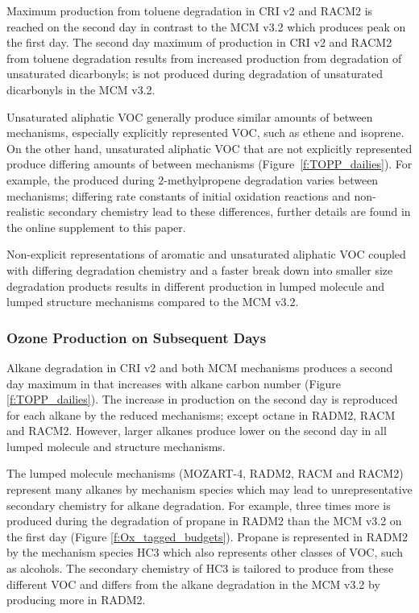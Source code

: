 Maximum  production from toluene degradation in CRI v2 and RACM2 is reached on the second day in contrast to the MCM v3.2 which produces peak  on the first day.
The second day maximum of  production in CRI v2 and RACM2 from toluene degradation results from increased  production from degradation of unsaturated dicarbonyls;  is not produced during degradation of unsaturated dicarbonyls in the MCM v3.2.

Unsaturated aliphatic VOC generally produce similar amounts of  between mechanisms, especially explicitly represented VOC, such as ethene and isoprene.
On the other hand, unsaturated aliphatic VOC that are not explicitly represented produce differing amounts of  between mechanisms \mbox{(Figure \ref{f:TOPP_dailies}).}
For example, the  produced during $2$-methylpropene degradation varies between mechanisms; differing rate constants of initial oxidation reactions and non-realistic secondary chemistry lead to these differences, further details are found in the online supplement to this paper.

Non-explicit representations of aromatic and unsaturated aliphatic VOC coupled with differing degradation chemistry and a faster break down into smaller size degradation products results in different  production in lumped molecule and lumped structure mechanisms compared to the MCM v3.2.
%
\subsubsection{Ozone Production on Subsequent Days} \label{sss:profiles} %
%
Alkane degradation in CRI v2 and both MCM mechanisms produces a second day maximum in  that increases with alkane carbon number (Figure \ref{f:TOPP_dailies}).
The increase in  production on the second day is reproduced for each alkane by the reduced mechanisms; except octane in RADM2, RACM and RACM2.
However, larger alkanes produce lower  on the second day in all lumped molecule and structure mechanisms.

The lumped molecule mechanisms (MOZART-4, RADM2, RACM and RACM2) represent many alkanes by mechanism species which may lead to unrepresentative secondary chemistry for alkane degradation.
For example, three times more  is produced during the degradation of propane in RADM2 than the MCM v3.2 on the first day (Figure \ref{f:Ox_tagged_budgets}).
Propane is represented in RADM2 by the mechanism species HC3 which also represents other classes of VOC, such as alcohols.
The secondary chemistry of HC3 is tailored to produce  from these different VOC and differs from the alkane degradation in the MCM v3.2 by producing more  in RADM2.

